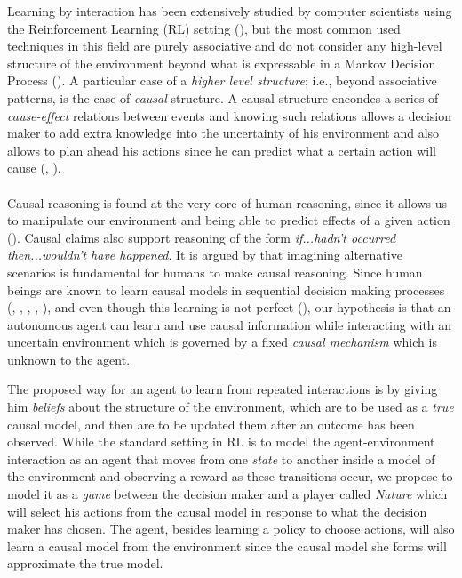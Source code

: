 \documentclass[english,letterpaper,12pt,final]{article}
\theoremstyle{definition}
\begin{document}

Learning by interaction has been extensively studied by computer scientists using the Reinforcement Learning (RL) setting (\cite{sutton1998reinforcement}), but the most common used techniques  in this field are purely associative and do not consider any high-level structure of the environment beyond what is expressable in a Markov Decision Process (\cite{garnelo2016towards}). A particular case of a \textit{higher level structure}; i.e., beyond associative patterns, is the case of \textit{causal} structure. A causal structure encondes a series of \textit{cause-effect} relations between events and knowing such relations allows a decision maker to add extra knowledge into the uncertainty of his environment and also allows to plan ahead his actions since he can predict what a certain action will cause (\cite{spirtes2000causation}, \cite{pearl2018theoretical}).\\
\\
Causal reasoning is found at the very core of human reasoning, since it allows us to manipulate our environment and being able to predict effects of a given action (\cite{spirtes2000causation}). Causal claims also support reasoning of the form \textit{if...hadn't occurred then...wouldn't have happened}. It is argued by \cite{pearl2018why} that imagining alternative scenarios is fundamental for humans to make causal reasoning.  Since human beings are known to learn causal models in sequential decision making processes (\cite{sloman2006causal}, \cite{nichols2007decision}, \cite{meder2010observing}, \cite{hagmayer2013repeated}, \cite{danks2014unifying}), and even though this learning is not perfect (\cite{rottman2014reasoning}), our hypothesis is that an autonomous agent can learn and use causal information while interacting with an uncertain environment which is governed by a fixed \textit{causal mechanism} which is unknown to the agent.  

The proposed way for an agent to learn from repeated interactions is by giving him \textit{beliefs} about the structure of the environment, which are to be used as a \textit{true} causal model, and then are to be updated them after an outcome has been observed. While the standard setting in RL is to model the agent-environment interaction as an agent that moves from one \textit{state} to another inside a model of the environment and observing a reward as these transitions occur, we propose to model it as a \textit{game} between the decision maker and a player called \textit{Nature} which will select his actions from the causal model in response to what the decision maker has chosen. The agent, besides learning a policy to choose actions, will also learn a causal model from the environment since the causal model she forms will approximate the true model.
\end{document}
